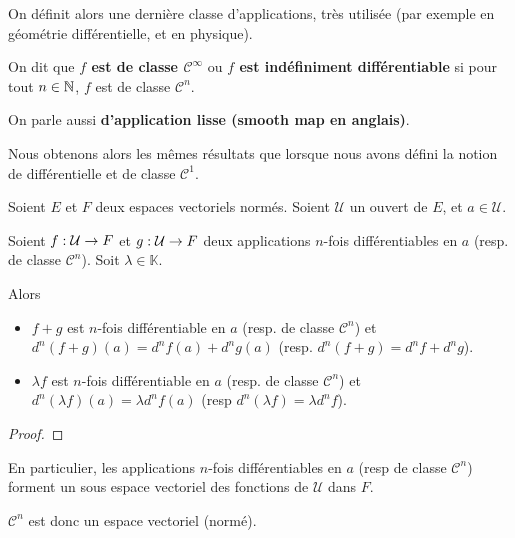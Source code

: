 On définit alors une dernière classe d'applications, très utilisée (par exemple
en géométrie différentielle, et en physique).

\begin{definition}
	On dit que \textbf{$f$ est de classe $\mathcal{C}^{\infty}$} ou \textbf{$f$
	est indéfiniment différentiable} si pour tout $n \in
	\mathbb{N}$, $f$ est de classe $\mathcal{C}^{n}$.

	On parle aussi \textbf{d'application lisse (smooth map en anglais)}.
\end{definition}

Nous obtenons alors les mêmes résultats que lorsque nous avons défini la notion
de différentielle et de classe $\mathcal{C}^{1}$.

\begin{proposition} [Linéarité]
	Soient $E$ et $F$ deux espaces vectoriels normés. Soient $\mathcal{U}$ un ouvert de $E$,
	et $a \in \mathcal{U}$.

	Soient $f : \mathcal{U} \rightarrow F$ et $g : \mathcal{U} \rightarrow F$
	deux applications $n$-fois différentiables en $a$ (resp. de classe $\mathcal{C}^{n}$).
	Soit $\lambda \in \mathbb{K}$.

	Alors

	\begin{itemize}
		\item $f + g$ est $n$-fois différentiable en $a$ (resp. de classe
			$\mathcal{C}^{n}$) et $d^{n}(f + g) (a) = d^{n}f(a) + d^{n}g(a)$
			(resp. $d^{n} (f + g) = d^{n} f + d^{n} g$).
		\item $\lambda f$ est $n$-fois différentiable en $a$ (resp. de classe
			$\mathcal{C}^{n}$) et $d^{n} (\lambda f) (a) = \lambda d^{n} f (a)$
			(resp $d^{n} (\lambda f) = \lambda d^{n} f$).
	\end{itemize}
\end{proposition}

\ifdefined\outputproof
\begin{proof}

\end{proof}
\fi

\begin{remarque}
	En particulier, les applications $n$-fois différentiables en $a$ (resp de
	classe $\mathcal{C}^{n}$) forment un sous espace vectoriel des fonctions de
	$\mathcal{U}$ dans $F$.

	$\mathcal{C}^{n}$ est donc un espace vectoriel (normé).
\end{remarque}

